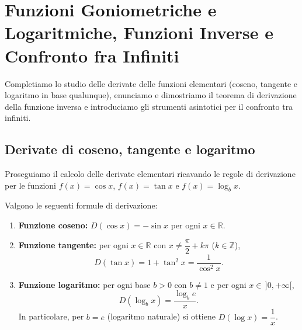 \section{Funzioni Goniometriche e Logaritmiche, Funzioni Inverse e Confronto fra Infiniti}

Completiamo lo studio delle derivate delle funzioni elementari (coseno, tangente e logaritmo in base qualunque), enunciamo e dimostriamo il teorema di derivazione della funzione inversa e introduciamo gli strumenti asintotici per il confronto tra infiniti.

\subsection{Derivate di coseno, tangente e logaritmo}

Proseguiamo il calcolo delle derivate elementari ricavando le regole di derivazione per le funzioni $f(x) = \cos x$, $f(x) = \tan x$ e $f(x) = \log_b x$.

\begin{propbox}
Valgono le seguenti formule di derivazione:
\begin{enumerate}
    \item \textbf{Funzione coseno:} $D(\cos x) = -\sin x$ per ogni $x \in \mathbb{R}$.
    \item \textbf{Funzione tangente:} per ogni $x \in \mathbb{R}$ con $x \neq \dfrac{\pi}{2} + k\pi$ ($k \in \mathbb{Z}$),
    \[
        D(\tan x) = 1 + \tan^2 x = \frac{1}{\cos^2 x}.
    \]
    \item \textbf{Funzione logaritmo:} per ogni base $b > 0$ con $b \neq 1$ e per ogni $x \in \,]0, +\infty[$,
    \[
        D(\log_b x) = \frac{\log_b e}{x}.
    \]
    In particolare, per $b = e$ (logaritmo naturale) si ottiene $D(\log x) = \dfrac{1}{x}$.
\end{enumerate}
\end{propbox}

